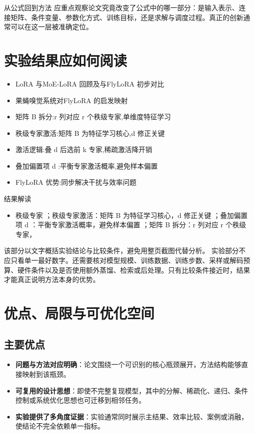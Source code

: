 \documentclass[UTF8,11pt,a4paper]{ctexart}
\newcommand{\term}[1]{\textbf{\textcolor{mainblue}{#1}}}
\begin{document}
\begin{keybox}{从公式回到方法}
应重点观察论文究竟改变了公式中的哪一部分：是输入表示、连接矩阵、条件变量、参数化方式、训练目标，还是求解与调度过程。真正的创新通常可以在这一层被准确定位。
\end{keybox}


\section{实验结果应如何阅读}
\begin{itemize}
\item LoRA 与MoE-LoRA 回顾及与FlyLoRA 初步对比
\item 果蝇嗅觉系统对FlyLoRA 的启发映射
\item 矩阵 B 拆分:r 列对应 r 个秩级专家,单维度特征学习
\item 秩级专家激活:矩阵 B 为特征学习核心,d 修正关键
\item 激活逻辑:叠 d 后选前 k 专家,稀疏激活降开销
\item 叠加偏置项 d :平衡专家激活概率,避免样本偏置
\item FlyLoRA 优势:同步解决干扰与效率问题
\end{itemize}

\begin{notebox}{结果解读}
\begin{itemize}
\item 秩级专家 ；秩级专家激活：矩阵 B 为特征学习核心，d 修正关键 ；叠加偏置项 d ：平衡专家激活概率，避免样本偏置 ；矩阵 B 拆分：r 列对应 r 个秩级专家，
\end{itemize}
\end{notebox}

该部分以文字概括实验结论与比较条件，避免用整页截图代替分析。
实验部分不应只看单一最好数字。还需要核对模型规模、训练数据、训练步数、采样或解码预算、硬件条件以及是否使用额外蒸馏、检索或后处理。只有比较条件接近时，结果才能真正说明方法本身的优势。

\section{优点、局限与可优化空间}
\subsection{主要优点}
\begin{itemize}
\item \term{问题与方法对应明确}：论文围绕一个可识别的核心瓶颈展开，方法结构能够直接映射到该瓶颈。
\item \term{可复用的设计思想}：即使不完整复现模型，其中的分解、稀疏化、递归、条件控制或系统优化思想也可迁移到相邻任务。
\item \term{实验提供了多角度证据}：实验通常同时展示主结果、效率比较、案例或消融，使结论不完全依赖单一指标。
\end{itemize}
\end{document}
